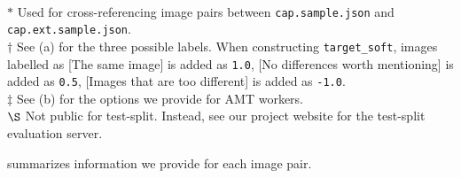 \documentclass[10pt,twocolumn,letterpaper]{article}
\begin{document}
\begin{table*}
\begin{minipage}{.98\textwidth}
{}
\end{minipage}\\[1pt]
\begin{minipage}{.95\textwidth}
  \fontsize{7pt}{8pt}\selectfont
  $\ast$ Used for cross-referencing image pairs between \texttt{cap.sample.json} and \texttt{cap.ext.sample.json}.\\[1.75pt]
  $\dagger$ See  (a) for the three possible labels. When constructing \texttt{target\_soft}, images labelled as [The same image] is added as \texttt{1.0}, [No differences worth mentioning] is added as \texttt{0.5}, [Images that are too different] is added as \texttt{-1.0}.\\[1.75pt]
  $\ddagger$ See  (b) for the options we provide for AMT workers.\\[1.75pt]
  ${\S}$ Not public for test-split. Instead, see our project website for the test-split evaluation server. \\[1.75pt]
\end{minipage}
  \caption{Data structure as in the data files. For details please refer to our project website.}
  \label{tab:json}
  \end{table*}
    summarizes information we provide for each image pair.
 
\end{document}

